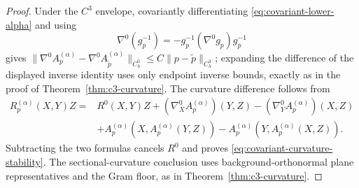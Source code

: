 \documentclass[11pt]{article}
\theoremstyle{definition}
\theoremstyle{remark}
\begin{document}
\begin{proof}
Under the $C^3$ envelope, covariantly differentiating
\eqref{eq:covariant-lower-alpha} and using
\[
  \nabla^0(g_p^{-1})
  =-g_p^{-1}(\nabla^0g_p)g_p^{-1}
\]
gives
$\|\nabla^0A_p^{(\alpha)}-\nabla^0A_{\widetilde p}^{(\alpha)}\|_{C^0_h}
\le C\|p-\widetilde p\|_{C^3_h}$; expanding the difference of the displayed
inverse identity uses only endpoint inverse bounds, exactly as in the proof of
Theorem~\ref{thm:c3-curvature}. The curvature difference follows from
\begin{equation}
\begin{split}
 R_p^{(\alpha)}(X,Y)Z
 ={}&R^0(X,Y)Z
   +(\nabla^0_XA_p^{(\alpha)})(Y,Z)
   -(\nabla^0_YA_p^{(\alpha)})(X,Z)\\
  &+A_p^{(\alpha)}(X,A_p^{(\alpha)}(Y,Z))
   -A_p^{(\alpha)}(Y,A_p^{(\alpha)}(X,Z)).
\end{split}
\end{equation}
Subtracting the two formulas cancels $R^0$ and proves
\eqref{eq:covariant-curvature-stability}. The sectional-curvature conclusion
uses background-orthonormal plane representatives and the Gram floor, as in
Theorem~\ref{thm:c3-curvature}.
\end{proof}
\end{document}
